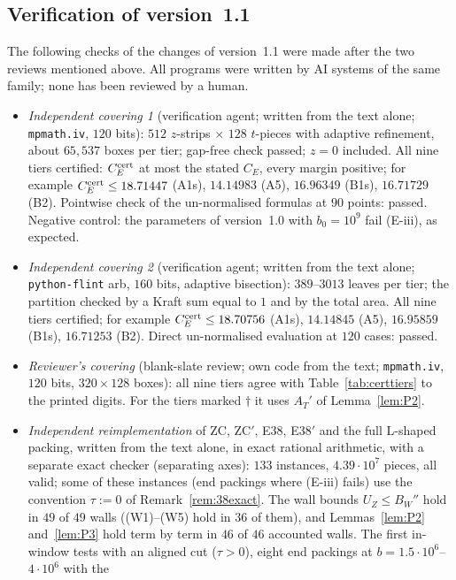 \documentclass[11pt]{amsart}
\theoremstyle{definition}
\theoremstyle{remark}
\numberwithin{equation}{section}
\begin{document}
\subsection*{Verification of version~1.1}
The following checks of the changes of version~1.1 were made after the two reviews mentioned above. All programs were
written by AI systems of the same family; none has been reviewed by a human.
\begin{itemize}
\item \emph{Independent covering 1} (verification agent; written from the text alone; \texttt{mpmath.iv}, $120$ bits):
$512$ $z$-strips $\times$ $128$ $t$-pieces with adaptive refinement, about $65{,}537$ boxes per tier; gap-free check
passed; $z=0$ included. All nine tiers certified: $C_E^{\rm cert}$ at most the stated $C_E$, every margin positive; for
example $C_E^{\rm cert}\le18.71447$ (A1s), $14.14983$ (A5), $16.96349$ (B1s), $16.71729$ (B2). Pointwise check of the
un-normalised formulas at $90$ points: passed. Negative control: the parameters of version~1.0 with $b_0=10^9$ fail
(E-iii), as expected.
\item \emph{Independent covering 2} (verification agent; written from the text alone; \texttt{python-flint} arb,
$160$ bits, adaptive bisection): $389$--$3013$ leaves per tier; the partition checked by a Kraft sum equal to $1$ and by
the total area. All nine tiers certified; for example $C_E^{\rm cert}\le18.70756$ (A1s), $14.14845$ (A5), $16.95859$
(B1s), $16.71253$ (B2). Direct un-normalised evaluation at $120$ cases: passed.
\item \emph{Reviewer's covering} (blank-slate review; own code from the text; \texttt{mpmath.iv}, $120$ bits,
$320\times128$ boxes): all nine tiers agree with Table~\ref{tab:certtiers} to the printed digits.
For the tiers marked $\dagger$ it uses $A_T'$ of Lemma~\ref{lem:P2}.
\item \emph{Independent reimplementation} of ZC, ZC$'$, E38, E38$'$ and the full L-shaped packing, written from the text
alone, in exact rational arithmetic, with a separate exact checker (separating axes): $133$ instances,
$4.39\cdot10^7$ pieces, all valid; some of these instances (end packings where (E-iii) fails) use the convention
$\tau:=0$ of Remark~\ref{rem:38exact}.
The wall bounds $U_Z\le B_W''$ hold in $49$ of $49$ walls ((W1)--(W5) hold in $36$ of them), and Lemmas~\ref{lem:P2} and~\ref{lem:P3} hold term by term
in $46$ of $46$ accounted walls.
The first in-window tests with an aligned cut ($\tau>0$), eight end packings at $b=1.5\cdot10^6$--$4\cdot10^6$ with the

\end{itemize}
\end{document}
